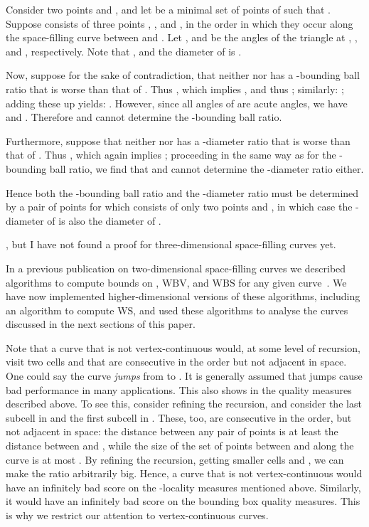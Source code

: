 \documentclass[11pt,a4paper]{article}
\def\WS{\ensuremath{\mathrm{WS}}\xspace}
\def\WBV{\ensuremath{\mathrm{WBV}}\xspace}
\def\WBS{\ensuremath{\mathrm{WBS}}\xspace}
\begin{document}
{Consider two points  and , and let  be a minimal set of points of  such that . Suppose  consists of three points , , and , in the order in which they occur along the space-filling curve between  and . Let ,  and  be the angles of the triangle  at , , and , respectively. Note that , and the diameter of  is .

Now, suppose for the sake of contradiction, that neither  nor  has a -bounding ball ratio that is worse than that of . Thus
, which implies
, and thus
; similarly:
; adding these up yields:
. However, since all angles of  are acute angles, we have  and . Therefore  and  cannot determine the -bounding ball ratio.

Furthermore, suppose that neither  nor  has a -diameter ratio that is worse than that of . Thus
, which again implies ; proceeding in the same way as for the -bounding ball ratio, we find that  and  cannot determine the -diameter ratio either.

Hence both the -bounding ball ratio and the -diameter ratio must be determined by a pair of points  for which  consists of only two points  and , in which case the -diameter of  is also the diameter of .},
but I have not found a proof for three-dimensional space-filling curves yet.

In a previous publication on two-dimensional space-filling curves we described algorithms to compute bounds on , \WBV, and \WBS for any given curve~\cite{Haverkort}. We have now implemented higher-dimensional versions of these algorithms, including an algorithm to compute \WS, and used these algorithms to analyse the curves discussed in the next sections of this paper.

Note that a curve that is not vertex-continuous would, at some level of recursion, visit two cells  and  that are consecutive in the order but not adjacent in space. One could say the curve \emph{jumps} from  to . It is generally assumed that jumps cause bad performance in many applications. This also shows in the quality measures described above. To see this, consider refining the recursion, and consider the last subcell  in  and the first subcell  in . These, too, are consecutive in the order, but not adjacent in space: the distance  between any pair of points  is at least the distance between  and , while the size of the set of points  between  and  along the curve is at most . By refining the recursion, getting smaller cells  and , we can make the ratio  arbitrarily big. Hence, a curve that is not vertex-continuous would have an infinitely bad score on the -locality measures mentioned above. Similarly, it would have an infinitely bad score on the bounding box quality measures. This is why we restrict our attention to vertex-continuous curves.
\end{document}
